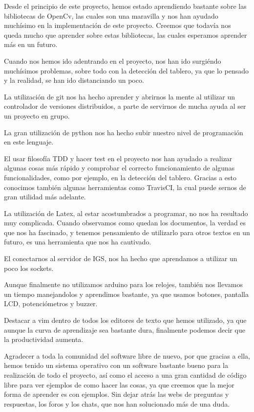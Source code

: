 \documentclass[12pt,a4paper]{report}
\begin{document}
Desde el principio de este proyecto, hemos estado aprendiendo bastante sobre las
bibliotecas de OpenCv, las cuales son una maravilla y nos han ayudado muchísimo en
la implementación de este proyecto. Creemos que todavía nos queda mucho que
aprender sobre estas bibliotecas, las cuales esperamos aprender más en un futuro. 

Cuando nos hemos ido adentrando en el proyecto, nos han ido surgiéndo muchísimos
problemas, sobre todo con la detección del tablero, ya que lo pensado y la
realidad, se han ido distanciando un poco. 

La utilización de git nos ha hecho aprender y abrirnos la mente al utilizar un
controlador de versiones distribuidos, a parte de servirnos de mucha ayuda al
ser un proyecto en grupo. 

La gran utilización de python nos ha hecho subir nuestro nivel de programación
en este lenguaje.

El usar filosofía TDD y hacer test en el proyecto nos han ayudado a realizar
algunas cosas más rápido y comprobar el correcto funcionamiento de algunas
funcionalidades, como por ejemplo, en la detección del tablero. Gracias a esto
conocimos también algunas herramientas como TravisCI, la cual puede sernos de
gran utilidad más adelante. 

La utilización de Latex, al estar acostumbrados a programar, no nos ha resultado
muy complicada. Cuando observamos como quedan los documentos, la verdad es que
nos ha fascinado, y tenemos pensamiento de utilizarlo para otros textos en un
futuro, es una herramienta que nos ha cautivado.

El conectarnos al servidor de IGS, nos ha hecho que aprendamos a utilizar un
poco los sockets.

Aunque finalmente no utilizamos arduino para los relojes, también nos llevamos
un tiempo manejandolos y aprendimos bastante, ya que usamos botones, pantalla
LCD, potenciómetros y buzzer.

Destacar a vim dentro de todos los editores de texto que hemos utilizado, ya que
aunque la curva de aprendizaje sea bastante dura, finalmente podemos decir que
la productividad aumenta. 

Agradecer a toda la comunidad del software libre de nuevo, por que gracias a
ella, hemos tenido un sistema operativo con un software bastante bueno para la
realización de todo el proyecto, así como el acceso a una gran cantidad de
código libre para ver ejemplos de como hacer las cosas, ya que creemos que la
mejor forma de aprender es con ejemplos. Sin dejar atrás las webs de preguntas y
respuestas, los foros y los chats, que nos han solucionado más de una duda. 
\end{document}

